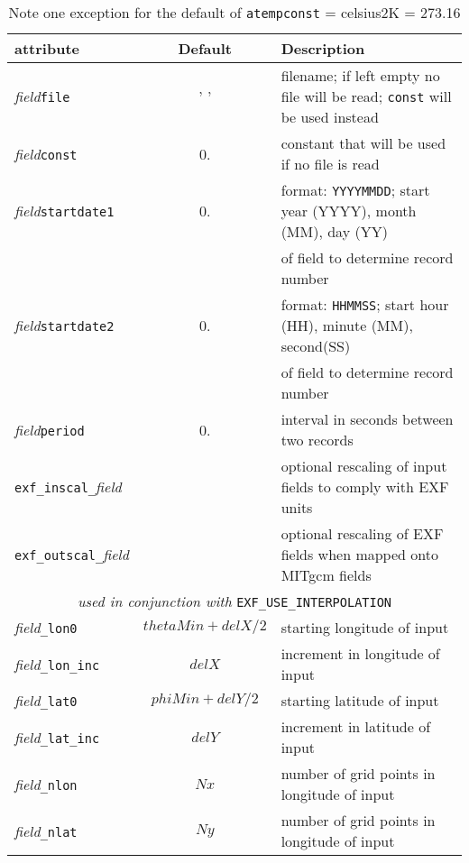 \begin{table}[h!]
  \label{tab:pkg:exf:runtime_attributes}
  {\footnotesize
    \begin{tabular}{|l|c|l|}
      \hline 
      \textbf{attribute} &  \textbf{Default} &  \textbf{Description}  \\
      \hline \hline
         \textit{field}\texttt{file} & ' ' & 
           filename; if left empty no file will be read; \texttt{const} will be used instead \\
         \textit{field}\texttt{const} & 0. &
           constant that will be used if no file is read  \\
         \textit{field}\texttt{startdate1} & 0. & 
           format: \texttt{YYYYMMDD}; start year (YYYY), month (MM), day (YY) \\
           ~&~& of field to determine record number \\
         \textit{field}\texttt{startdate2} & 0. &
           format: \texttt{HHMMSS}; start hour (HH), minute (MM), second(SS) \\
           ~&~& of field to determine record number\\
         \textit{field}\texttt{period} & 0. &
           interval in seconds between two records \\
         \texttt{exf\_inscal\_}\textit{field}& ~ & 
           optional rescaling of input fields to comply with EXF units \\
         \texttt{exf\_outscal\_}\textit{field}& ~ &
           optional rescaling of EXF fields when mapped onto MITgcm fields \\
         \hline
         \multicolumn{3}{|c|}{\textit{used in conjunction with} 
                              \texttt{EXF\_USE\_INTERPOLATION}} \\
         \hline
         \textit{field}\texttt{\_lon0} & $thetaMin+delX/2$  & 
           starting longitude of input \\
         \textit{field}\texttt{\_lon\_inc} & $delX$ &
           increment in longitude of input \\
         \textit{field}\texttt{\_lat0} &  $phiMin+delY/2$ &
           starting latitude of input \\
         \textit{field}\texttt{\_lat\_inc} & $delY$ &
           increment in latitude of input \\
         \textit{field}\texttt{\_nlon} & $Nx$ &
           number of grid points in longitude of input \\
         \textit{field}\texttt{\_nlat} & $Ny$ &
           number of grid points in longitude of input \\
      \hline
    \end{tabular}
   }
   \caption{\newline
            Note one exception for the default of 
            \texttt{atempconst} = celsius2K = 273.16}
\end{table}

